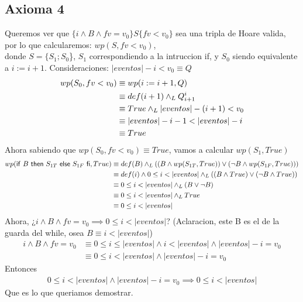 \documentclass[../document.tex]{subfiles}
\begin{document}
\subsection*{Axioma 4}

Queremos ver que $\{i\land B\land fv=v_0\}S\{fv<v_0\}$ sea una tripla de Hoare valida, por lo que calcularemos: $wp(S, fv<v_0)$,
\\ donde $S=\{S_1;S_0$\}, $S_1$ correspondiendo a la intruccion if, y $S_0$ siendo equivalente a $i:=i+1$.
\salto{\baselineskip}
Consideraciones: $|eventos|-i<v_0 \equiv Q$
\begin{align*}
    wp(S_0, fv<v_0)&\equiv wp(i:=i+1, Q)
    \\&\equiv def(i+1)\yLuego Q_{i+1}^i
    \\&\equiv True\yLuego |eventos|-(i+1)<v_0
    \\&\equiv |eventos|-i-1<|eventos|-i
    \\&\equiv True
\end{align*}
Ahora sabiendo que $wp(S_0, fv<v_0) \equiv True$, vamos a calcular $wp(S_1, True)$
\begin{align*}
    wp(\mathsf{if}\ B\ \mathsf{then}\ S_{1T}\ \mathsf{else}\ S_{1F}\ \mathsf{fi}, True)&\equiv def(B) \land _L ((B\land wp(S_{1T},True))\lor (\lnot B \land wp(S_{1F},True)))
    \\&\equiv def(i) \land  0\leq i < |eventos| \land _L ((B\land True)\lor (\lnot B \land True))
    \\&\equiv 0\leq i < |eventos| \land _L (B\lor \lnot B)
    \\&\equiv 0\leq i < |eventos| \land _L True
    \\&\equiv 0\leq i < |eventos|
\end{align*}
\salto{\baselineskip}
Ahora, ¿$i\land B \land fv=v_0\implies 0\leq i < |eventos|$? (Aclaracion, este B es el de la guarda del while, osea $B\equiv i<|eventos|$)
\begin{align*}
    i\land B \land fv=v_0 &\equiv 0 \leq i\leq |eventos| \land i<|eventos| \land |eventos|-i=v_0
    \\&\equiv 0 \leq i<|eventos| \land |eventos|-i=v_0
\end{align*}
Entonces
\begin{align*}
    0 \leq i<|eventos| \land |eventos|-i=v_0\implies 0 \leq i<|eventos|
\end{align*}
Que es lo que queriamos demostrar.
\end{document}
